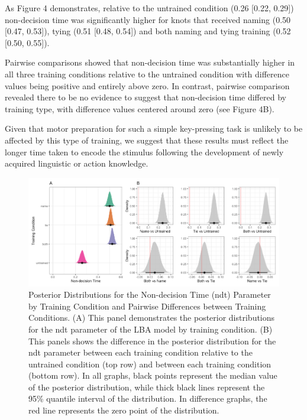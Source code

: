 \documentclass[
  man, donotrepeattitle,floatsintext]{apa6}
\begin{document}
As Figure 4 demonstrates, relative to the untrained condition (0.26 {[}0.22, 0.29{]}) non-decision time was significantly higher for knots that received naming (0.50 {[}0.47, 0.53{]}), tying (0.51 {[}0.48, 0.54{]}) and both naming and tying training (0.52 {[}0.50, 0.55{]}).

Pairwise comparisons showed that non-decision time was substantially higher in all three training conditions relative to the untrained condition with difference values being positive and entirely above zero. In contrast, pairwise comparison revealed there to be no evidence to suggest that non-decision time differed by training type, with difference values centered around zero (see Figure 4B).

Given that motor preparation for such a simple key-pressing task is unlikely to be affected by this type of training, we suggest that these results must reflect the longer time taken to encode the stimulus following the development of newly acquired linguistic or action knowledge.



\begin{figure}[H]

{\centering \includegraphics[height=0.67\textheight,]{../figures/from_file/ndt} 

}

\caption{Posterior Distributions for the Non-decision Time (ndt) Parameter by Training Condition and Pairwise Differences between Training Conditions. (A) This panel demonstrates the posterior distributions for the ndt parameter of the LBA model by training condition. (B) This panels shows the difference in the posterior distribution for the ndt parameter between each training condition relative to the untrained condition (top row) and between each training condition (bottom row). In all graphs, black points represent the median value of the posterior distribution, while thick black lines represent the 95\% quantile interval of the distribution. In difference graphs, the red line represents the zero point of the distribution.}\label{fig:ndt-plot}
\end{figure}
\end{document}
